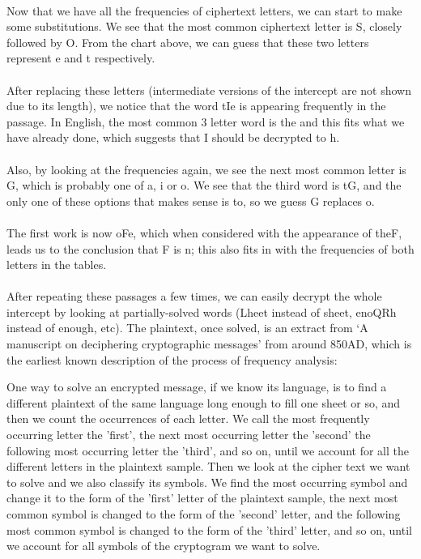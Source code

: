 \documentclass[Lau,binding=0.6cm,oneside]{sapthesis}
\begin{document}
\ \\
Now that we have all the frequencies of ciphertext letters, we can start to make some substitutions. We see that the most common ciphertext letter is \textsf{S}, closely followed by \textsf{O}. From the chart above, we can guess that these two letters represent \textsf{e} and \textsf{t} respectively.\\\\
After replacing these letters (intermediate versions of the intercept are not shown due to its length), we notice that the word \textsf{tIe} is appearing frequently in the passage. In English, the most common 3 letter word is \textsf{the} and this fits what we have already done, which suggests that \textsf{I} should be decrypted to \textsf{h}.\\\\
Also, by looking at the frequencies again, we see the next most common letter is \textsf{G}, which is probably one of \textsf{a}, \textsf{i} or \textsf{o}. We see that the third word is \textsf{tG}, and the only one of these options that makes sense is \textsf{to}, so we guess \textsf{G} replaces \textsf{o}.\\\\
The first work is now \textsf{oFe}, which when considered with the appearance of \textsf{theF}, leads us to the conclusion that \textsf{F} is \textsf{n}; this also fits in with the frequencies of both letters in the tables.\\\\
After repeating these passages a few times, we can easily decrypt the whole intercept by looking at partially-solved words (\textsf{Lheet} instead of \textsf{sheet}, \textsf{enoQRh} instead of \textsf{enough}, etc). The plaintext, once solved, is an extract from `A manuscript on deciphering cryptographic messages' from around 850AD, which is the earliest known description of the process of frequency analysis:\\

\begin{displayquote}\textsf{{\small
One way to solve an encrypted message, if we know its language, is to find a different plaintext of the same language long enough to fill one sheet or so, and then we count the occurrences of each letter. We call the most frequently occurring letter the 'first', the next most occurring letter the 'second' the following most occurring letter the 'third', and so on, until we account for all the different letters in the plaintext sample. Then we look at the cipher text we want to solve and we also classify its symbols. We find the most occurring symbol and change it to the form of the 'first' letter of the plaintext sample, the next most common symbol is changed to the form of the 'second' letter, and the following most common symbol is changed to the form of the 'third' letter, and so on, until we account for all symbols of the cryptogram we want to solve.
}}
\end{displayquote}
\ \\
\end{document}
